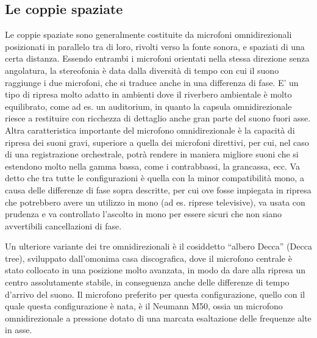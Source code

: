 \clearpage

\subsection{Le coppie spaziate}

Le coppie spaziate sono generalmente costituite da microfoni omnidirezionali
posizionati in parallelo tra di loro, rivolti verso la fonte sonora, e spaziati
di una certa distanza. Essendo entrambi i microfoni orientati nella stessa
direzione senza angolatura, la stereofonia è data dalla diversità di tempo
con cui il suono raggiunge i due microfoni, che si traduce anche in una
differenza di fase. E’ un tipo di ripresa molto adatto in ambienti dove il
riverbero ambientale è molto equilibrato, come ad es. un auditorium, in
quanto la capsula omnidirezionale riesce a restituire con ricchezza di dettaglio
anche gran parte del suono fuori asse. Altra caratteristica importante del
microfono omnidirezionale è la capacità di ripresa dei suoni gravi, superiore
a quella dei microfoni direttivi, per cui, nel caso di una registrazione
orchestrale, potrà rendere in maniera migliore suoni che si estendono molto
nella gamma bassa, come i contrabbassi, la grancassa, ecc. Va detto che tra
tutte le configurazioni è quella con la minor compatibilità mono, a causa delle
differenze di fase sopra descritte, per cui ove fosse impiegata in ripresa che
potrebbero avere un utilizzo in mono (ad es. riprese televisive), va usata con
prudenza e va controllato l’ascolto in mono per essere sicuri che non siano
avvertibili cancellazioni di fase.



Un ulteriore variante dei tre omnidirezionali è il cosiddetto “albero Decca”
(Decca tree), sviluppato dall’omonima casa discografica, dove il microfono
centrale è stato collocato in una posizione molto avanzata, in modo da dare
alla ripresa un centro assolutamente stabile, in conseguenza anche delle
differenze di tempo d’arrivo del suono. Il microfono preferito per questa
configurazione, quello con il quale questa configurazione è nata, è il
Neumann M50, ossia un microfono omnidirezionale a pressione dotato di una marcata
esaltazione delle frequenze alte in asse.

